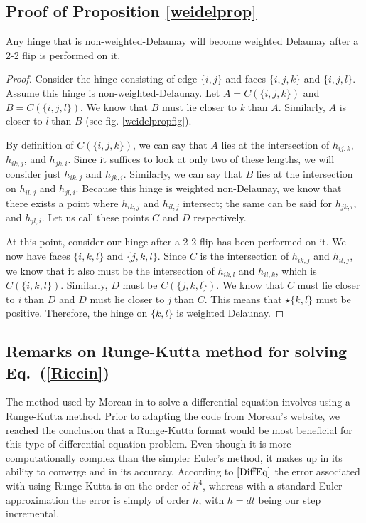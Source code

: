 \documentclass[12pt]{article}
\begin{document}
\subsection{Proof of Proposition \ref{weidelprop}}
Any hinge that is non-weighted-Delaunay will become weighted Delaunay after a 2-2 flip is performed on it.
\begin{proof}
\label{prop2}
Consider the hinge consisting of edge $\{i, j\}$ and faces $\{i, j, k\}$ and $\{i, j, l\}$. Assume this hinge is non-weighted-Delaunay. Let $A = C(\{i, j, k\})$ and $B = C(\{i, j, l\})$. We know that $B$ must lie closer to \textit{k} than $A$. Similarly, $A$ is closer to \textit{l} than $B$ (see fig. \ref{weidelpropfig}).\newline

By definition of $C(\{i, j, k\})$, we can say that $A$ lies at the intersection of $h_{ij,k}$, $h_{ik,j}$, and $h_{jk,i}$. Since it suffices to look at only two of these lengths, we will consider just $h_{ik,j}$ and $h_{jk,i}$. Similarly, we can say that $B$ lies at the intersection on $h_{il,j}$ and $h_{jl,i}$. Because this hinge is weighted non-Delaunay, we know that there exists a point where $h_{ik,j}$ and $h_{il,j}$ intersect; the same can be said for $h_{jk,i}$, and $h_{jl,i}$. Let us call these points $C$ and $D$ respectively.

At this point, consider our hinge after a 2-2 flip has been performed on it. We now have faces $\{i, k, l\}$ and $\{j, k, l\}$. Since $C$ is the intersection of $h_{ik,j}$ and $h_{il,j}$, we know that it also must be the intersection of $h_{ik,l}$ and $h_{il,k}$, which is $C(\{i, k, l\})$. Similarly, $D$ must be $C(\{j, k, l\})$. We know that $C$ must lie closer to \textit{i} than $D$ and $D$ must lie closer to \textit{j} than $C$. This means that $\star\{k, l\}$ must be positive. Therefore, the hinge on $\{k, l\}$ is weighted Delaunay. \qedhere

\end{proof}

\subsection{Remarks on Runge-Kutta method for solving Eq.~(\ref{Riccin})}

The method used by Moreau in \cite{JPM} to solve a differential equation involves using a Runge-Kutta method. Prior to adapting the code from Moreau's website, we reached the conclusion that a Runge-Kutta format would be most beneficial for this type of differential equation problem. Even though it is more computationally complex than the simpler Euler's method, it makes up in its ability to converge and in its accuracy. According to $\cite{DiffEq}$ the error associated with using Runge-Kutta is on the order of $h^4$, whereas with a standard Euler approximation the error is simply of order $h$, with $h = dt$ being our step incremental.
\end{document}
